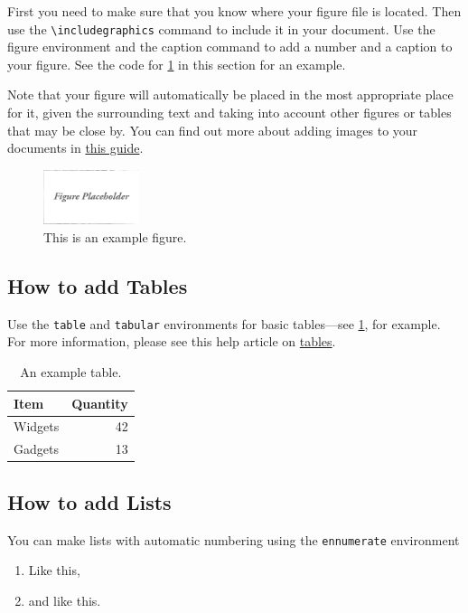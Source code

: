 \documentclass[11pt,twocolumn]{article}
\begin{document}
First you need to make sure that you know where your figure file is located. Then use the \verb|\includegraphics| command to include it in your document. Use the figure environment and the caption command to add a number and a caption to your figure. See the code for \cref{fig:draft} in this section for an example.

Note that your figure will automatically be placed in the most appropriate place for it, given the surrounding text and taking into account other figures or tables that may be close by. You can find out more about adding images to your documents in \href{https://www.overleaf.com/learn/how-to/Including_images_on_Overleaf}{this guide}.

\begin{figure}[h!]
	\centering
	\includegraphics[width=0.25\textwidth]{draft}
	\caption{This is an example figure.}
	\label{fig:draft}
\end{figure}

\subsection{How to add Tables}

Use the \verb|table| and \verb|tabular| environments for basic tables---see \cref{tab:widgets}, for example. For more information, please see this help article on \href{https://www.overleaf.com/learn/latex/tables}{tables}. 

\begin{table}[h!]
	\centering
	\caption{An example table.}
	\label{tab:widgets}
	\begin{tabular}{l|r}
		Item & Quantity \\\hline
		Widgets & 42 \\
		Gadgets & 13
	\end{tabular}
\end{table}


\subsection{How to add Lists}

You can make lists with automatic numbering using the \verb|ennumerate| environment

\begin{enumerate}
	\item Like this,
	\item and like this.
\end{enumerate}
\end{document}

